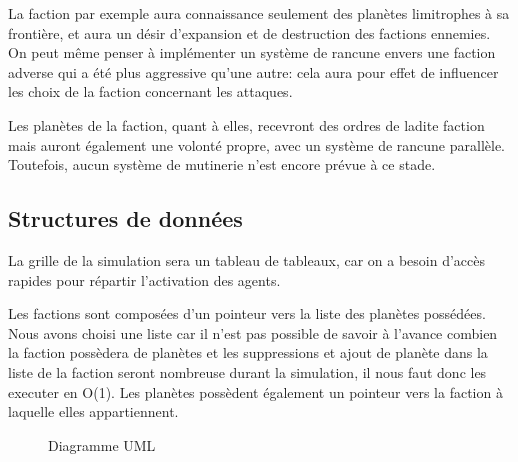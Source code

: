 \documentclass{article}
\begin{document}
      La faction par exemple aura connaissance seulement des planètes limitrophes à sa frontière, et aura un désir d'expansion et de destruction des factions ennemies. On peut même penser à implémenter un système de rancune envers une faction adverse qui a été plus aggressive qu'une autre: cela aura pour effet de influencer les choix de la faction concernant les attaques.

      Les planètes de la faction, quant à elles, recevront des ordres de ladite faction mais auront également une volonté propre, avec un système de rancune parallèle. Toutefois, aucun système de mutinerie n'est encore prévue à ce stade.

    
    \subsection{Structures de données}
    La grille de la simulation sera un tableau de tableaux, car on a besoin d'accès rapides pour répartir l'activation des agents.

    Les factions sont composées d'un pointeur vers la liste des planètes possédées. Nous avons choisi une liste car il n'est pas possible de savoir à l'avance combien la faction possèdera de planètes et les suppressions et ajout de planète dans la liste de la faction seront nombreuse durant la simulation, il nous faut donc les executer en O(1). Les planètes possèdent également un pointeur vers la faction à laquelle elles appartiennent.

    \begin{figure}[h]
      \begin{center}
      \end{center}
      \caption{Diagramme UML}
    \end{figure}
\end{document}
